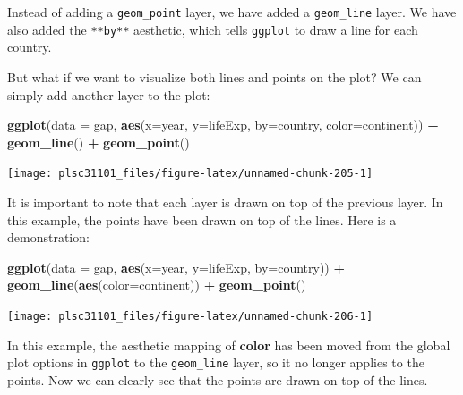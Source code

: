 \documentclass[]{book}
\newenvironment{Shaded}{\begin{snugshade}}{\end{snugshade}}
\newcommand{\KeywordTok}[1]{\textcolor[rgb]{0.13,0.29,0.53}{\textbf{#1}}}
\newcommand{\DataTypeTok}[1]{\textcolor[rgb]{0.13,0.29,0.53}{#1}}
\newcommand{\StringTok}[1]{\textcolor[rgb]{0.31,0.60,0.02}{#1}}
\newcommand{\OperatorTok}[1]{\textcolor[rgb]{0.81,0.36,0.00}{\textbf{#1}}}
\newcommand{\NormalTok}[1]{#1}
\begin{document}
Instead of adding a \texttt{geom\_point} layer, we have added a
\texttt{geom\_line} layer. We have also added the \texttt{**by**}
aesthetic, which tells \texttt{ggplot} to draw a line for each country.

But what if we want to visualize both lines and points on the plot? We
can simply add another layer to the plot:

\begin{Shaded}
\begin{Highlighting}[]
\KeywordTok{ggplot}\NormalTok{(}\DataTypeTok{data =}\NormalTok{ gap, }\KeywordTok{aes}\NormalTok{(}\DataTypeTok{x=}\NormalTok{year, }\DataTypeTok{y=}\NormalTok{lifeExp, }\DataTypeTok{by=}\NormalTok{country, }\DataTypeTok{color=}\NormalTok{continent)) }\OperatorTok{+}\StringTok{ }
\StringTok{  }\KeywordTok{geom_line}\NormalTok{() }\OperatorTok{+}\StringTok{ }
\StringTok{  }\KeywordTok{geom_point}\NormalTok{()}
\end{Highlighting}
\end{Shaded}

\begin{center}\texttt{[image: plsc31101\_files/figure-latex/unnamed-chunk-205-1]} \end{center}

It is important to note that each layer is drawn on top of the previous
layer. In this example, the points have been drawn on top of the lines.
Here is a demonstration:

\begin{Shaded}
\begin{Highlighting}[]
\KeywordTok{ggplot}\NormalTok{(}\DataTypeTok{data =}\NormalTok{ gap, }\KeywordTok{aes}\NormalTok{(}\DataTypeTok{x=}\NormalTok{year, }\DataTypeTok{y=}\NormalTok{lifeExp, }\DataTypeTok{by=}\NormalTok{country)) }\OperatorTok{+}\StringTok{ }
\StringTok{  }\KeywordTok{geom_line}\NormalTok{(}\KeywordTok{aes}\NormalTok{(}\DataTypeTok{color=}\NormalTok{continent)) }\OperatorTok{+}\StringTok{ }
\StringTok{  }\KeywordTok{geom_point}\NormalTok{()}
\end{Highlighting}
\end{Shaded}

\begin{center}\texttt{[image: plsc31101\_files/figure-latex/unnamed-chunk-206-1]} \end{center}

In this example, the aesthetic mapping of \textbf{color} has been moved
from the global plot options in \texttt{ggplot} to the
\texttt{geom\_line} layer, so it no longer applies to the points. Now we
can clearly see that the points are drawn on top of the lines.
\end{document}

